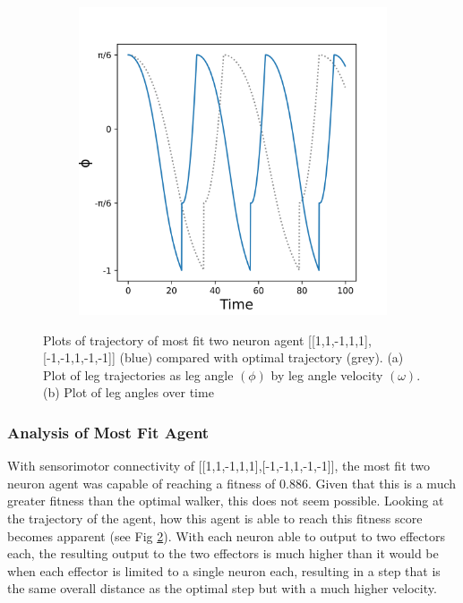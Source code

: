\documentclass{article}
\begin{document}
\begin{figure}[htbp]
\begin{subfigure}[b]{0.5\textwidth}
    \includegraphics[width=\textwidth]{../plots/angleTime2_224_18.png}
    \caption{}
    \label{fig:AngleTimePlot2Best}
  \end{subfigure}
  \caption{Plots of trajectory of most fit two neuron agent [[1,1,-1,1,1],[-1,-1,1,-1,-1]] (blue) compared with optimal trajectory (grey). (a) Plot of leg trajectories as leg angle \((\phi)\) by leg angle velocity \((\omega)\). (b) Plot of leg angles over time}
  \label{fig:plots2Best}
\end{figure} 

\subsubsection{Analysis of Most Fit Agent}

With sensorimotor connectivity of [[1,1,-1,1,1],[-1,-1,1,-1,-1]], the most fit two neuron agent was capable of reaching a fitness of 0.886. Given that this is a much greater fitness than the optimal walker, this does not seem possible. Looking at the trajectory of the agent, how this agent is able to reach this fitness score becomes apparent (see Fig \ref{fig:plots2Best}). With each neuron able to output to two effectors each, the resulting output to the two effectors is much higher than it would be when each effector is limited to a single neuron each, resulting in a step that is the same overall distance as the optimal step but with a much higher velocity. 
\end{document}
